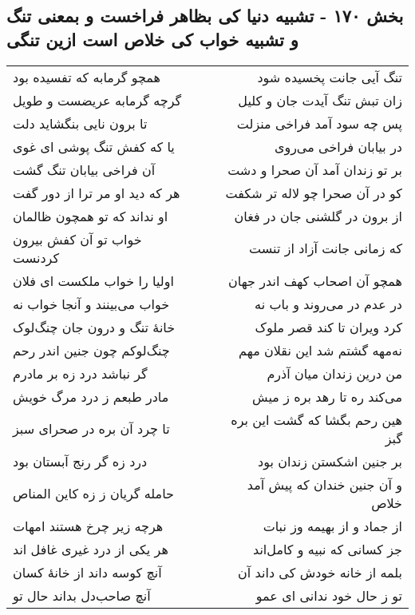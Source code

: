 \begin{center}
\section*{بخش ۱۷۰ - تشبیه دنیا کی بظاهر فراخست و بمعنی تنگ و تشبیه خواب کی خلاص است ازین تنگی}
\label{sec:sh170}
\begin{longtable}{l p{0.5cm} r}
همچو گرمابه که تفسیده بود
&&
تنگ آیی جانت پخسیده شود
\\
گرچه گرمابه عریضست و طویل
&&
زان تبش تنگ آیدت جان و کلیل
\\
تا برون نایی بنگشاید دلت
&&
پس چه سود آمد فراخی منزلت
\\
یا که کفش تنگ پوشی ای غوی
&&
در بیابان فراخی می‌روی
\\
آن فراخی بیابان تنگ گشت
&&
بر تو زندان آمد آن صحرا و دشت
\\
هر که دید او مر ترا از دور گفت
&&
کو در آن صحرا چو لاله تر شکفت
\\
او نداند که تو همچون ظالمان
&&
از برون در گلشنی جان در فغان
\\
خواب تو آن کفش بیرون کردنست
&&
که زمانی جانت آزاد از تنست
\\
اولیا را خواب ملکست ای فلان
&&
همچو آن اصحاب کهف اندر جهان
\\
خواب می‌بینند و آنجا خواب نه
&&
در عدم در می‌روند و باب نه
\\
خانهٔ تنگ و درون جان چنگ‌لوک
&&
کرد ویران تا کند قصر ملوک
\\
چنگ‌لوکم چون جنین اندر رحم
&&
نه‌مهه گشتم شد این نقلان مهم
\\
گر نباشد درد زه بر مادرم
&&
من درین زندان میان آذرم
\\
مادر طبعم ز درد مرگ خویش
&&
می‌کند ره تا رهد بره ز میش
\\
تا چرد آن بره در صحرای سبز
&&
هین رحم بگشا که گشت این بره گبز
\\
درد زه گر رنج آبستان بود
&&
بر جنین اشکستن زندان بود
\\
حامله گریان ز زه کاین المناص
&&
و آن جنین خندان که پیش آمد خلاص
\\
هرچه زیر چرخ هستند امهات
&&
از جماد و از بهیمه وز نبات
\\
هر یکی از درد غیری غافل اند
&&
جز کسانی که نبیه و کامل‌اند
\\
آنچ کوسه داند از خانهٔ کسان
&&
بلمه از خانه خودش کی داند آن
\\
آنچ صاحب‌دل بداند حال تو
&&
تو ز حال خود ندانی ای عمو
\\
\end{longtable}
\end{center}
